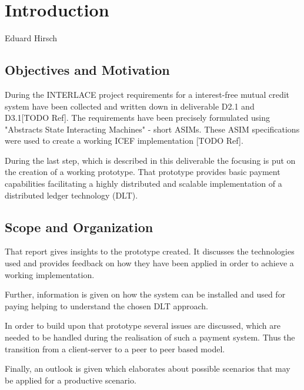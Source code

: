 \chapter{Introduction}
\label{ch:Introduction}

\vspace{-1cm}
\begin{center}
Eduard Hirsch
\end{center}


\section{Objectives and Motivation}

During the INTERLACE project requirements for a interest-free mutual credit system have been collected and written down in deliverable D2.1 and D3.1[TODO Ref]. The requirements have been precisely formulated using "Abstracts State Interacting Machines" - short ASIMs. These ASIM specifications were used to create a working ICEF implementation [TODO Ref].

During the last step, which is described in this deliverable the focusing is put on the creation of a working prototype. That prototype provides basic payment capabilities facilitating a highly distributed and scalable implementation of a distributed ledger technology (DLT).

\section{Scope and Organization}

That report gives insights to the prototype created. It discusses the technologies used and provides feedback on how they have been applied in order to achieve a working implementation.

Further, information is given on how the system can be installed and used for paying helping to understand the chosen DLT approach.

In order to build upon that prototype several issues are discussed, which are needed to be handled during the realisation of such a payment system. Thus the transition from a client-server to a peer to peer based model.

Finally, an outlook is given which elaborates about possible scenarios that may be applied for a productive scenario.

\newpage
